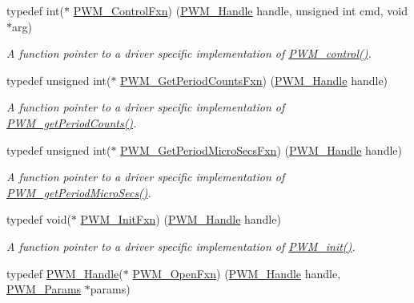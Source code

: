 \begin{DoxyCompactItemize}
typedef int($\ast$ \hyperlink{_p_w_m_8h_af538c912f876c434c62e7e0e28d41b75}{P\+W\+M\+\_\+\+Control\+Fxn}) (\hyperlink{_p_w_m_8h_afdefc765f42bbad4dca246fda6e1354b}{P\+W\+M\+\_\+\+Handle} handle, unsigned int cmd, void $\ast$arg)
\begin{DoxyCompactList}\small\item\em A function pointer to a driver specific implementation of \hyperlink{_p_w_m_8h_ade999f5b12997479efa1ac85aaf46ef5}{P\+W\+M\+\_\+control()}. \end{DoxyCompactList}\item 
typedef unsigned int($\ast$ \hyperlink{_p_w_m_8h_a4ac091a98716ff54c33b0d300a2a7fee}{P\+W\+M\+\_\+\+Get\+Period\+Counts\+Fxn}) (\hyperlink{_p_w_m_8h_afdefc765f42bbad4dca246fda6e1354b}{P\+W\+M\+\_\+\+Handle} handle)
\begin{DoxyCompactList}\small\item\em A function pointer to a driver specific implementation of \hyperlink{_p_w_m_8h_af7c6d8e045f6f5cc8b978d68bead5b41}{P\+W\+M\+\_\+get\+Period\+Counts()}. \end{DoxyCompactList}\item 
typedef unsigned int($\ast$ \hyperlink{_p_w_m_8h_a4eb84d54d5b3a05e6ae9d8a580a48b45}{P\+W\+M\+\_\+\+Get\+Period\+Micro\+Secs\+Fxn}) (\hyperlink{_p_w_m_8h_afdefc765f42bbad4dca246fda6e1354b}{P\+W\+M\+\_\+\+Handle} handle)
\begin{DoxyCompactList}\small\item\em A function pointer to a driver specific implementation of \hyperlink{_p_w_m_8h_a150ccda2b9cb65f8c12d173bba10df53}{P\+W\+M\+\_\+get\+Period\+Micro\+Secs()}. \end{DoxyCompactList}\item 
typedef void($\ast$ \hyperlink{_p_w_m_8h_a38666ae4b117b81d35758258012b251a}{P\+W\+M\+\_\+\+Init\+Fxn}) (\hyperlink{_p_w_m_8h_afdefc765f42bbad4dca246fda6e1354b}{P\+W\+M\+\_\+\+Handle} handle)
\begin{DoxyCompactList}\small\item\em A function pointer to a driver specific implementation of \hyperlink{_p_w_m_8h_aadae3fe77e36cbf9643a22eeb99fb01e}{P\+W\+M\+\_\+init()}. \end{DoxyCompactList}\item 
typedef \hyperlink{_p_w_m_8h_afdefc765f42bbad4dca246fda6e1354b}{P\+W\+M\+\_\+\+Handle}($\ast$ \hyperlink{_p_w_m_8h_a16b7b446398f8b90e4fa287c6e4a0981}{P\+W\+M\+\_\+\+Open\+Fxn}) (\hyperlink{_p_w_m_8h_afdefc765f42bbad4dca246fda6e1354b}{P\+W\+M\+\_\+\+Handle} handle, \hyperlink{struct_p_w_m___params}{P\+W\+M\+\_\+\+Params} $\ast$params)

\end{DoxyCompactItemize}
